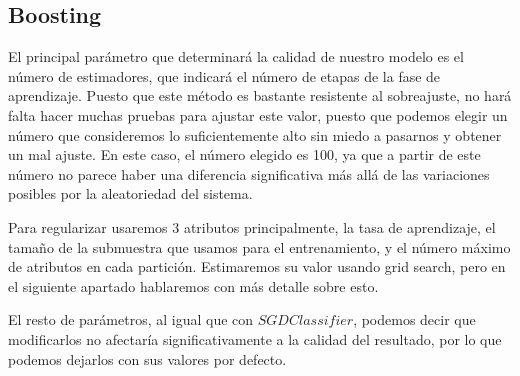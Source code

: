 \documentclass{article}
\begin{document}
	\subsection{Boosting}
	El principal parámetro que determinará la calidad de nuestro modelo es el número de estimadores, que indicará el número de etapas de la fase de aprendizaje. Puesto que este método es bastante resistente al sobreajuste, no hará falta hacer muchas pruebas para ajustar este valor, puesto que podemos elegir un número que consideremos lo suficientemente alto sin miedo a pasarnos y obtener un mal ajuste. En este caso, el número elegido es 100, ya que a partir de este número no parece haber una diferencia significativa más allá de las variaciones posibles por la aleatoriedad del sistema.
	\par 
	Para regularizar usaremos 3 atributos principalmente, la tasa de aprendizaje, el tamaño de la submuestra que usamos para el entrenamiento, y el número máximo de atributos en cada partición. Estimaremos su valor usando grid search, pero en el siguiente apartado hablaremos con más detalle sobre esto.
	\par 
	 El resto de parámetros, al igual que con $SGDClassifier$, podemos decir que modificarlos no afectaría significativamente a la calidad del resultado, por lo que podemos dejarlos con sus valores por defecto.
\end{document}
